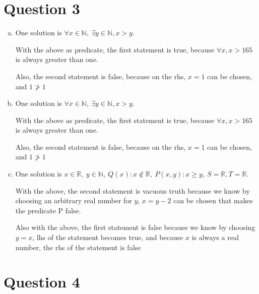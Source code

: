 \documentclass[12pt]{article}
\begin{document}
\section*{Question 3}
\begin{enumerate}[a.]
    \item

    One solution is $\forall x \in \mathbb{N},\:\exists y \in \mathbb{N}, x > y$.

    With the above as predicate, the first statement is true, because $\forall x, x > 165$ is
    always greater than one.

    Also, the second statement is false, because on the rhs, $x = 1$ can be chosen, and $1 \ngtr 1$

    \item

    One solution is $\forall x \in \mathbb{N},\:\exists y \in \mathbb{N}, x > y$.

    With the above as predicate, the first statement is true, because $\forall x, x > 165$ is
    always greater than one.

    Also, the second statement is false, because on the rhs, $x = 1$ can be chosen, and $1 \ngtr 1$

    \item

    One solution is $x \in \mathbb{R},\: y \in \mathbb{N},\:Q(x): x \notin \mathbb{R},\:P(x,y): x \geq y,\:S = \mathbb{R}, T = \mathbb{R}$.

    With the above, the second statement is vacuous truth because we know by choosing an arbitrary real number for $y$,
    $x = y - 2$ can be chosen that makes the predicate P false.

    Also with the above, the first statement is false because we know by choosing $y = x$,
    lhs of the statement becomes true, and because $x$ is always a real number, the rhs of the statement is false



\end{enumerate}

\section*{Question 4}
\end{document}
